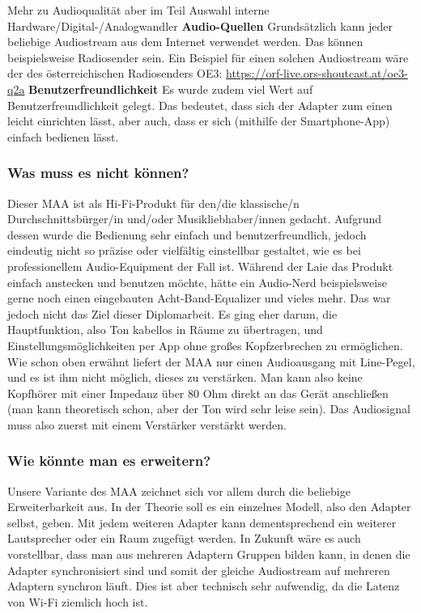 \documentclass[11pt, twoside]{article}
\begin{document}
Mehr zu Audioqualität aber im Teil \glqq Auswahl interne Hardware/Digital-/Analogwandler\grqq{}
\newpage
\textbf{Audio-Quellen}\newline
Grundsätzlich kann jeder beliebige Audiostream aus dem Internet verwendet werden. Das können beispielsweise Radiosender sein.
Ein Beispiel für einen solchen Audiostream wäre der des österreichischen Radiosenders \glqq OE3\grqq{}: \newline
\url{https://orf-live.ors-shoutcast.at/oe3-q2a}
\vspace{4mm}\newline
\textbf{Benutzerfreundlichkeit}\newline
Es wurde zudem viel Wert auf Benutzerfreundlichkeit gelegt. Das bedeutet, dass sich der Adapter zum einen leicht einrichten lässt, aber auch, dass er sich (mithilfe der Smartphone-App) einfach bedienen lässt.
\subsubsection{Was muss es nicht können?}
Dieser MAA ist als Hi-Fi-Produkt für den/die klassische/n Durchschnittsbürger/in und/oder Musikliebhaber/innen gedacht. Aufgrund dessen wurde die Bedienung sehr einfach und benutzerfreundlich, jedoch eindeutig nicht so präzise oder vielfältig einstellbar gestaltet, wie es bei professionellem Audio-Equipment der Fall ist. Während der Laie das Produkt einfach anstecken und benutzen möchte, hätte ein Audio-Nerd beispielsweise gerne noch einen eingebauten Acht-Band-Equalizer und vieles mehr. Das war jedoch nicht das Ziel dieser Diplomarbeit. Es ging eher darum, die Hauptfunktion, also Ton kabellos in Räume zu übertragen, und Einstellungsmöglichkeiten per App ohne großes Kopfzerbrechen zu ermöglichen.\newline
Wie schon oben erwähnt liefert der MAA nur einen Audioausgang mit Line-Pegel, und es ist ihm nicht möglich, dieses zu verstärken. Man kann also keine Kopfhörer mit einer Impedanz über 80 Ohm direkt an das Gerät anschließen (man kann theoretisch schon, aber der Ton wird sehr leise sein). Das Audiosignal muss also zuerst mit einem Verstärker verstärkt werden.\newline
\subsubsection{Wie könnte man es erweitern?}
Unsere Variante des MAA zeichnet sich vor allem durch die beliebige Erweiterbarkeit aus. In der Theorie soll es ein einzelnes Modell, also den Adapter selbst, geben. Mit jedem weiteren Adapter kann dementsprechend ein weiterer Lautsprecher oder ein Raum zugefügt werden. In Zukunft wäre es auch vorstellbar, dass man aus mehreren Adaptern Gruppen bilden kann, in denen die Adapter synchronisiert sind und somit der gleiche Audiostream auf mehreren Adaptern synchron läuft. Dies ist aber technisch sehr aufwendig, da die Latenz von Wi-Fi ziemlich hoch ist.
\end{document}

